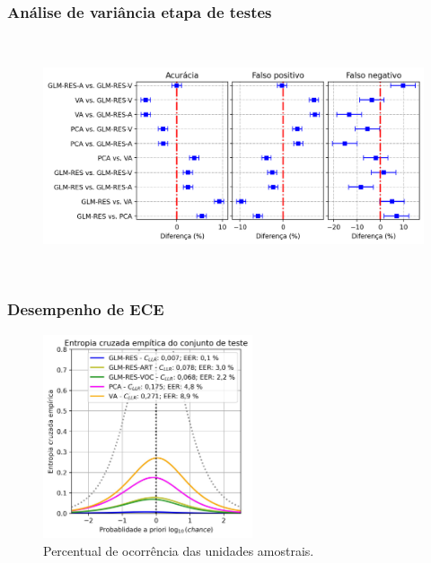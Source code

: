 \documentclass[121pt, aspectratio=169, t]{beamer}
\begin{document}
\begin{frame}[fragile=singleslide]
	\frametitle{Análise de variância etapa de testes}
	\begin{figure}
		\centering
		\includegraphics[height=7cm]{ANOVA_Acuracis_00.png}
	\end{figure}
\end{frame}

\begin{frame}[fragile=singleslide]
	\frametitle{Desempenho de ECE}
		\begin{figure}
		\centering
		\includegraphics[height=6cm]{ECE_01.jpg}
		\caption{Percentual de ocorrência das unidades amostrais.}
	\end{figure}

\end{frame}

\end{document}
